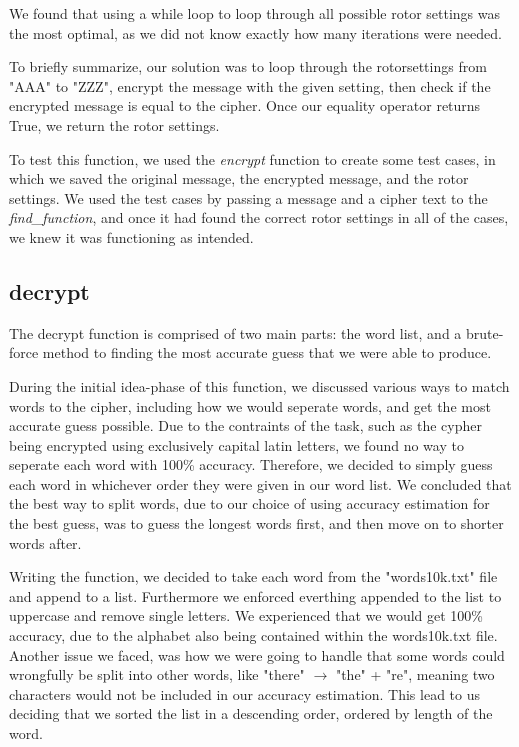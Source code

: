 \documentclass{article}
\begin{document}
We found that using a while loop to loop through all possible rotor settings was the most optimal, 
as we did not know exactly how many iterations were needed.

To briefly summarize, our solution was to loop through the rotorsettings from "AAA" to "ZZZ", encrypt the message with
the given setting, then check if the encrypted message is equal to the cipher. Once our equality operator returns True, we return the rotor settings.

To test this function, we used the \textit{encrypt} function to create some test cases, in which we saved the original message, the encrypted message, and the rotor settings.
We used the test cases by passing a message and a cipher text to the \textit{find\_function}, and once it had found the correct rotor settings in all of the cases, we knew it was functioning as intended.

\subsection{decrypt}
The decrypt function is comprised of two main parts: the word list,
and a brute-force method to finding the most accurate guess that we were able to produce.

During the initial idea-phase of this function, we discussed various ways to match words to the cipher, 
including how we would seperate words, and get the most accurate guess possible. Due to the contraints of the task, 
such as the cypher being encrypted using exclusively capital latin letters, we found no way to seperate each word with 100\% accuracy.
Therefore, we decided to simply guess each word in whichever order they were given in our word list. 
We concluded that the best way to split words, due to our choice of using accuracy estimation for the best guess, was to guess the longest words first, 
and then move on to shorter words after. 

Writing the function, we decided to take each word from the "words10k.txt" file and append to a list.
Furthermore we enforced everthing appended to the list to uppercase and remove single letters.
We experienced that we would get 100\% accuracy, due to the alphabet also being contained within the words10k.txt file.
Another issue we faced, was how we were going to handle that some words could wrongfully be split into other words, like "there" $\rightarrow$ "the" + "re", 
meaning two characters would not be included in our accuracy estimation.
This lead to us deciding that we sorted the list in a descending order, ordered by length of the word.
\end{document}
